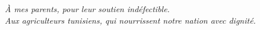 
\cleardoublepage
\thispagestyle{empty}
\vspace*{\fill}
\begin{center}
\itshape
À mes parents, pour leur soutien indéfectible.\\
Aux agriculteurs tunisiens, qui nourrissent notre nation avec dignité.
\end{center}
\vspace*{\fill}
